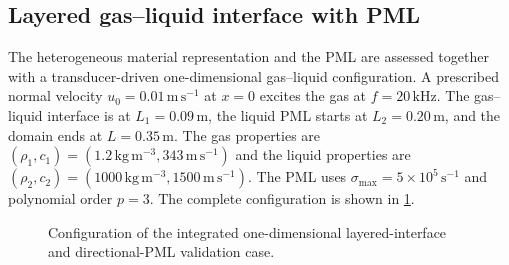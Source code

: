 \documentclass[final,12pt,nopreprintline,longtitle]{elsarticle}
\newcommand{\x}{\mathbf{x}}
\newcommand{\h}{\boldsymbol{h}}
\begin{document}
\subsection{Layered gas--liquid interface with PML}
\label{sec:layeredInterface}
\label{sec:combinedInterfacePML}

The heterogeneous material representation and the PML are assessed together
with a transducer-driven one-dimensional gas--liquid configuration.  A
prescribed normal velocity
$u_0=0.01\,\mathrm{m\,s^{-1}}$ at $x=0$ excites the gas at
$f=20\,\mathrm{kHz}$.  The gas--liquid interface is at
$L_1=0.09\,\mathrm{m}$, the liquid PML starts at $L_2=0.20\,\mathrm{m}$, and
the domain ends at $L=0.35\,\mathrm{m}$.  The gas properties are
$(\rho_1,c_1)=(1.2\,\mathrm{kg\,m^{-3}},343\,\mathrm{m\,s^{-1}})$ and the
liquid properties are
$(\rho_2,c_2)=(1000\,\mathrm{kg\,m^{-3}},1500\,\mathrm{m\,s^{-1}})$.  The PML uses
$\sigma_{\max}=5\times10^5\,\mathrm{s^{-1}}$ and polynomial order $p=3$.
The complete configuration is shown in \cref{fig:combinedLayeredSchematic}.

\begin{figure}[htbp]
    \centering
    \caption{Configuration of the integrated one-dimensional layered-interface
    and directional-PML validation case.}
    \label{fig:combinedLayeredSchematic}
\end{figure}
\end{document}
